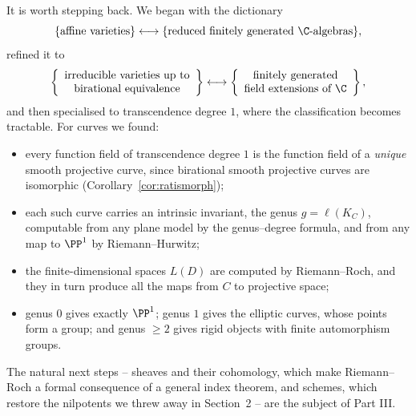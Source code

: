 It is worth stepping back. We began with the dictionary
$$\{\text{affine varieties}\} \longleftrightarrow \{\text{reduced finitely generated } \C\text{-algebras}\},$$
refined it to
$$\left\{\begin{array}{c}\text{irreducible varieties up to}\\ \text{birational equivalence}\end{array}\right\} \longleftrightarrow \left\{\begin{array}{c}\text{finitely generated}\\ \text{field extensions of } \C\end{array}\right\},$$
and then specialised to transcendence degree $1$, where the classification becomes tractable. For curves we found:
\begin{itemize}
	\item every function field of transcendence degree $1$ is the function field of a \emph{unique} smooth projective curve, since birational smooth projective curves are isomorphic (Corollary~\ref{cor:ratismorph});
	\item each such curve carries an intrinsic invariant, the genus $g = \ell(K_C)$, computable from any plane model by the genus--degree formula, and from any map to $\PP^1$ by Riemann--Hurwitz;
	\item the finite-dimensional spaces $L(D)$ are computed by Riemann--Roch, and they in turn produce all the maps from $C$ to projective space;
	\item genus $0$ gives exactly $\PP^1$; genus $1$ gives the elliptic curves, whose points form a group; and genus $\geq 2$ gives rigid objects with finite automorphism groups.
\end{itemize}
The natural next steps -- sheaves and their cohomology, which make Riemann--Roch a formal consequence of a general index theorem, and schemes, which restore the nilpotents we threw away in Section~2 -- are the subject of Part III.

